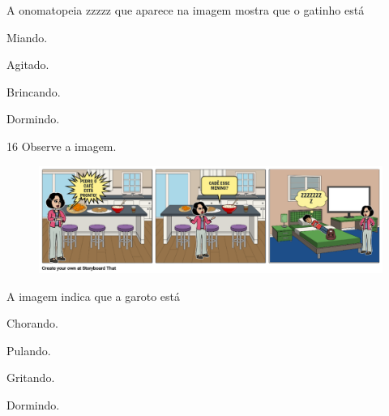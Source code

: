 A onomatopeia zzzzz que aparece na imagem mostra que o gatinho está

\begin{multicols}{2}
\begin{escolha}
\item Miando.

\item Agitado.

\item Brincando.

\item Dormindo.
\end{escolha}
\end{multicols}

\num{16} Observe a imagem.

\begin{figure}[htpb!]
\centering
\includegraphics[width=\textwidth]{media/image162.png}
\end{figure}


A imagem indica que a garoto está

\begin{multicols}{2}
\begin{escolha}
\item Chorando.

\item Pulando.

\item Gritando.

\item Dormindo.
\end{escolha}
\end{multicols}


